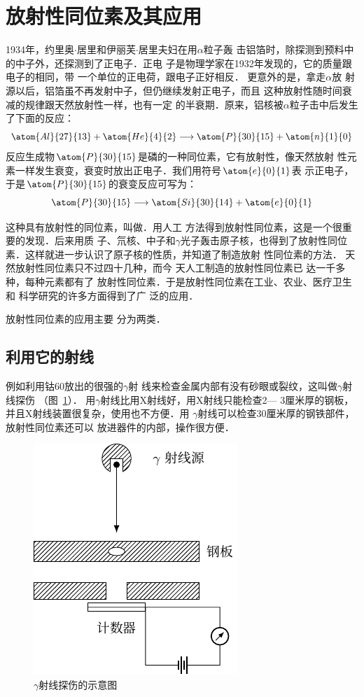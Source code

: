 \section{放射性同位素及其应用}
1934年，约里奥$\cdot$居里和伊丽芙$\cdot$居里夫妇在用$\alpha$粒子轰
击铝箔时，除探测到预料中的中子外，还探测到了正电子．正电
子是物理学家在1932年发现的，它的质量跟电子的相同，带
一个单位的正电荷，跟电子正好相反．
更意外的是，拿走$\alpha$放
射源以后，铝箔虽不再发射中子，但仍继续发射正电子，而且
这种放射性随时间衰减的规律跟天然放射性一样，也有一定
的半衰期．原来，铝核被$\alpha$粒子击中后发生了下面的反应：
\[\atom{Al}{27}{13}+\atom{He}{4}{2}\longrightarrow\atom{P}{30}{15}+\atom{n}{1}{0}  \]
反应生成物$\atom{P}{30}{15}$是磷的一种同位素，它有放射性，像天然放射
性元素一样发生衰变，衰变时放出正电子．我们用符号$\atom{e}{0}{1}$表
示正电子，于是$\atom{P}{30}{15}$的衰变反应可写为：
\[\atom{P}{30}{15}\longrightarrow \atom{Si}{30}{14}+\atom{e}{0}{1} \]

这种具有放射性的同位素，叫做．用人工
方法得到放射性同位素，这是一个很重要的发现．后来用质
子、氘核、中子和$\gamma$光子轰击原子核，也得到了放射性同位
素．这样就进一步认识了原子核的性质，并知道了制造放射
性同位素的方法．
天然放射性同位素只不过四十几种，而今
天人工制造的放射性同位素已
达一千多种，每种元素都有了
放射性同位素．于是放射性同位素在工业、农业、医疗卫生和
科学研究的许多方面得到了广
泛的应用．

放射性同位素的应用主要
分为两类．

\subsection{利用它的射线}

例如利用钴60放出的很强的$\gamma$射
线来检查金属内部有没有砂眼或裂纹，这叫做$\gamma$射线探伤
（图~\ref{fig_C_9-9}）．
用$\gamma$射线比用X射线好，用X射线只能检查2—
3厘米厚的钢板，并且X射线装置很复杂，使用也不方便．用
$\gamma$射线可以检查30厘米厚的钢铁部件，放射性同位素还可以
放进器件的内部，操作很方便．
\begin{figure}[htbp]
    \centering
    \includegraphics{fig/C/9-9.pdf}
    \caption{$\gamma$射线探伤的示意图}\label{fig_C_9-9}
\end{figure}

